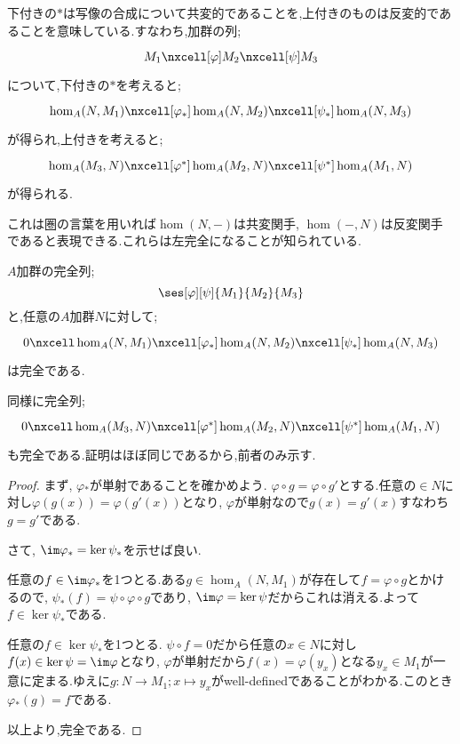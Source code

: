 下付きの$\ast$は写像の合成について共変的であることを,上付きのものは反変的であることを意味している.すなわち,加群の列;
\[\begin{tikzcd}
M_1\nxcell[\varphi]M_2\nxcell[\psi]M_3
\end{tikzcd}\]
について,下付きの$\ast$を考えると;
\[\begin{tikzcd}
\hom_A(N,M_1)\nxcell[\varphi_\ast]\hom_A(N,M_2)\nxcell[\psi_\ast]\hom_A(N,M_3)
\end{tikzcd}\]
が得られ,上付きを考えると;
\[\begin{tikzcd}
\hom_A(M_3,N)\nxcell[\varphi^\ast]\hom_A(M_2,N)\nxcell[\psi^\ast]\hom_A(M_1,N)
\end{tikzcd}\]
が得られる.

これは圏の言葉を用いれば$\hom(N,-)$は共変関手, $\hom(-,N)$は反変関手であると表現できる.これらは左完全になることが知られている.
\begin{prop}
$A$加群の完全列;
\[\ses[\varphi][\psi]{M_1}{M_2}{M_3}\]
と,任意の$A$加群$N$に対して;
\[\begin{tikzcd}
0\nxcell\hom_A(N,M_1)\nxcell[\varphi_\ast]\hom_A(N,M_2)\nxcell[\psi_\ast]\hom_A(N,M_3)
\end{tikzcd}\]
は完全である.
\end{prop}

同様に完全列;
\[\begin{tikzcd}
0\nxcell\hom_A(M_3,N)\nxcell[\varphi^\ast]\hom_A(M_2,N)\nxcell[\psi^\ast]\hom_A(M_1,N)
\end{tikzcd}\]
も完全である.証明はほぼ同じであるから,前者のみ示す.
\begin{proof}
	まず, $\varphi{}_\ast $が単射であることを確かめよう. $\varphi\circ g=\varphi\circ g'$とする.任意の$\in N$に対し$\varphi(g(x))=\varphi(g'(x))$となり, $\varphi$が単射なので$g(x)=g'(x)$すなわち$g=g'$である.
	
	さて, $\im\varphi{}_\ast =\ker\psi_\ast $を示せば良い.
	\begin{mrkw}
		\item 
		任意の$f\in\im\varphi_\ast$を1つとる.ある$g\in\hom_A(N,M_1)$が存在して$f=\varphi\circ g$とかけるので, $\psi_\ast (f)=\psi\circ\varphi\circ g$であり, $\im\varphi=\ker\psi$だからこれは消える.よって$f\in\ker\psi_\ast $である.
		\item 
		任意の$f\in\ker\psi_\ast $を1つとる. $\psi\circ f=0$だから任意の$x\in N$に対し$f(x)\in\ker\psi=\im\varphi$となり, $\varphi$が単射だから$f(x)=\varphi(y_x)$となる$y_x\in M_1$が一意に定まる.ゆえに$g:N\to M_1;x\mapsto y_x$がwell-definedであることがわかる.このとき$\varphi{}_\ast (g)=f$である.
	\end{mrkw}
	以上より,完全である.
\end{proof}

